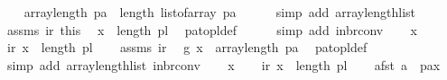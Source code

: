 \begin{isabellebody}
\ \ \isamarkupfalse%
\ {\isachardoublequoteopen}array{\isacharunderscore}{\kern0pt}length\ pa\ {\isacharequal}{\kern0pt}\ length\ {\isacharparenleft}{\kern0pt}list{\isacharunderscore}{\kern0pt}of{\isacharunderscore}{\kern0pt}array\ pa{\isacharparenright}{\kern0pt}{\isachardoublequoteclose}\isanewline
\ \ \ \ \isamarkupfalse%
\ {\isacharparenleft}{\kern0pt}simp\ add{\isacharcolon}{\kern0pt}\ array{\isacharunderscore}{\kern0pt}length{\isacharunderscore}{\kern0pt}list{\isacharparenright}{\kern0pt}\isanewline
\ \ \isamarkupfalse%
\ assms\ ir\ this\ \isamarkupfalse%
\ {\isachardoublequoteopen}x{}\ {\isacharless}{\kern0pt}\ length\ pl{\isachardoublequoteclose}\ \isamarkupfalse%
\ pa{\isacharunderscore}{\kern0pt}to{\isacharunderscore}{\kern0pt}pl{\isacharunderscore}{\kern0pt}def\isanewline
\ \ \ \ \isamarkupfalse%
\ {\isacharparenleft}{\kern0pt}simp\ add{\isacharcolon}{\kern0pt}\ in{\isacharunderscore}{\kern0pt}br{\isacharunderscore}{\kern0pt}conv{\isacharparenright}{\kern0pt}\isanewline
{}\isamarkupfalse%
\isanewline
\ \ \isamarkupfalse%
\ x{}\isanewline
\ \ \isamarkupfalse%
\ ir{\isacharcolon}{\kern0pt}\ {\isachardoublequoteopen}x{}\ {\isacharless}{\kern0pt}\ length\ pl{\isachardoublequoteclose}\isanewline
\ \ \isamarkupfalse%
\ assms\ ir\ \isamarkupfalse%
\ g{}{\isacharcolon}{\kern0pt}\ {\isachardoublequoteopen}x{}\ {\isacharless}{\kern0pt}\ array{\isacharunderscore}{\kern0pt}length\ pa{\isachardoublequoteclose}\ \isamarkupfalse%
\ pa{\isacharunderscore}{\kern0pt}to{\isacharunderscore}{\kern0pt}pl{\isacharunderscore}{\kern0pt}def\isanewline
\ \ \ \ \isamarkupfalse%
\ {\isacharparenleft}{\kern0pt}simp\ add{\isacharcolon}{\kern0pt}\ array{\isacharunderscore}{\kern0pt}length{\isacharunderscore}{\kern0pt}list\ in{\isacharunderscore}{\kern0pt}br{\isacharunderscore}{\kern0pt}conv{\isacharparenright}{\kern0pt}\isanewline
{}\isamarkupfalse%
\isanewline
\ \ \isamarkupfalse%
\ x{}\isanewline
\ \ \isamarkupfalse%
\ ir{\isacharcolon}{\kern0pt}\ {\isachardoublequoteopen}x{}\ {\isacharless}{\kern0pt}\ length\ pl{\isachardoublequoteclose}\isanewline
\ \ \isamarkupfalse%
\ afst{\isacharcolon}{\kern0pt}\ {\isachardoublequoteopen}a\ {\isacharequal}{\kern0pt}\ {\isacharparenleft}{\kern0pt}pa{\isacharbrackleft}{\kern0pt}{\isacharbrackleft}{\kern0pt}x{}{\isacharbrackright}{\kern0pt}{\isacharbrackright}{\kern0pt}{\isacharparenright}{\kern0pt}{\isacharbrackleft}{\kern0pt}{\isacharbrackleft}{\kern0pt}{}{\isacharbrackright}{\kern0pt}{\isacharbrackright}{\kern0pt}{\isachardoublequoteclose}\isanewline

\end{isabellebody}
